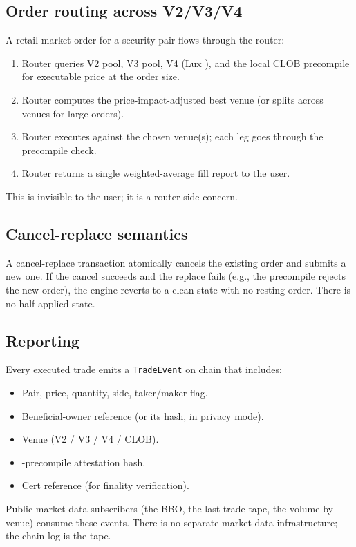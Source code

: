 \subsection{Order routing across V2/V3/V4}

A retail market order for a security pair flows through the router:

\begin{enumerate}[leftmargin=1.4em]
  \item Router queries V2 pool, V3 pool, V4 (Lux \DEX{}), and the
        local CLOB precompile for executable price at the order
        size.
  \item Router computes the price-impact-adjusted best venue (or
        splits across venues for large orders).
  \item Router executes against the chosen venue(s); each leg goes
        through the \Liquidity{} precompile check.
  \item Router returns a single weighted-average fill report to the
        user.
\end{enumerate}

This is invisible to the user; it is a router-side concern.

\subsection{Cancel-replace semantics}

A cancel-replace transaction atomically cancels the existing order
and submits a new one. If the cancel succeeds and the replace fails
(e.g., the precompile rejects the new order), the engine reverts
to a clean state with no resting order. There is no half-applied
state.

\subsection{Reporting}

Every executed trade emits a \texttt{TradeEvent} on chain that
includes:

\begin{itemize}[leftmargin=1.2em]
  \item Pair, price, quantity, side, taker/maker flag.
  \item Beneficial-owner reference (or its hash, in privacy mode).
  \item Venue (V2 / V3 / V4 / CLOB).
  \item \Liquidity{}-precompile attestation hash.
  \item \Quasar{}Cert reference (for finality verification).
\end{itemize}

Public market-data subscribers (the BBO, the last-trade tape, the
volume by venue) consume these events. There is no separate
market-data infrastructure; the chain log is the tape.
